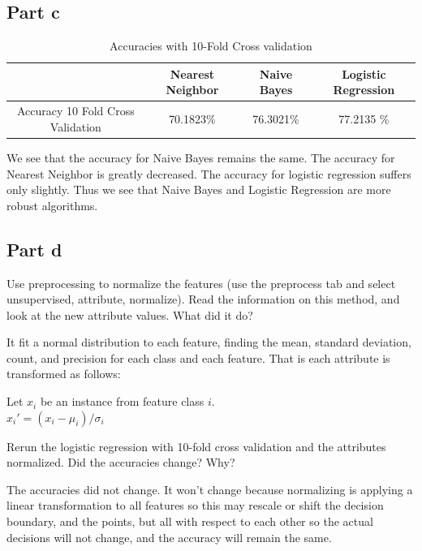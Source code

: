 \documentclass{article}
\begin{document}
\subsection{Part c}
\begin{table}[H]
    \begin{center}
     \caption{Accuracies with 10-Fold Cross validation}
    \begin{tabular}{|c|c|c|c|}
   \hline
        & Nearest Neighbor & Naive Bayes & Logistic Regression \\ \hline
         Accuracy 10 Fold Cross Validation &  70.1823\%&76.3021\% &  77.2135 \%   \\ \hline
       
             
     
    \end{tabular}
    \end{center}
\end{table}

We see that the accuracy for Naive Bayes remains the same. The accuracy for Nearest Neighbor is greatly decreased. The accuracy for logistic regression suffers only slightly. Thus we see that Naive Bayes and Logistic Regression are more robust algorithms. 

\subsection{Part d}
Use preprocessing to normalize the features (use the preprocess tab and select unsupervised, attribute, normalize). Read the information on this method, and look at the new attribute values. What did it do?

It fit a normal distribution to each feature, finding the mean, standard deviation, count, and precision for each class and each feature. That is each attribute is transformed as follows: 
\begin{center}
Let $x_i$ be an instance from feature class $i$. \\
$x_i' = (x_i-\mu_i)/\sigma_i$
\end{center}

Rerun the logistic regression with 10-fold cross validation and the attributes normalized. Did the accuracies change? Why?

The accuracies did not change. It won't change because normalizing is applying a linear transformation to all features so this may rescale or shift the decision boundary, and the points, but all with respect to each other so the actual decisions will not change, and the accuracy will remain the same. 
\end{document}
